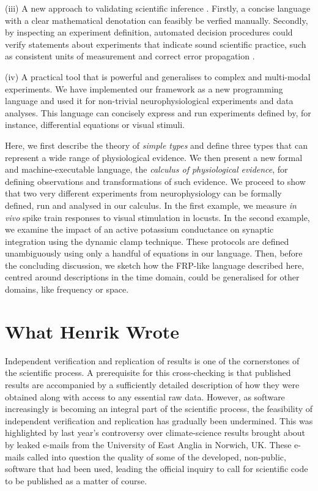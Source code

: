 (iii) A new approach to validating scientific inference
\citep{Editors2003, Editors2010, DeSchutter2010}. Firstly, a concise
language with a clear mathematical denotation can feasibly be verfied
manually. Secondly, by inspecting an experiment definition, automated
decision procedures could verify statements about experiments that
indicate sound scientific practice, such as consistent units of
measurement \citep{Kennedy1997} and correct error propagation
\citep{Taylor1997}.

(iv) A practical tool that is powerful and generalises to complex and
multi-modal experiments. We have implemented our framework as a new
programming language and used it for non-trivial neurophysiological
experiments and data analyses. This language can concisely express and
run experiments defined by, for instance, differential equations or
visual stimuli.

Here, we first describe the theory of \emph{simple types}
\citep{Pierce2002} and define three types that can represent a wide
range of physiological evidence. We then present a new formal and
machine-executable language, the \emph{calculus of physiological
  evidence}, for defining observations and transformations of such
evidence. We proceed to show that two very different experiments from
neurophysiology can be formally defined, run and analysed in our
calculus. In the first example, we measure \emph{in vivo} spike train
responses to visual stimulation in locusts. In the second example, we
examine the impact of an active potassium conductance on synaptic
integration using the dynamic clamp technique. These protocols are
defined unambiguously using only a handful of equations in our
language. Then, before the concluding discussion, we sketch how the
FRP-like language described here, centred around descriptions in the
time domain, could be generalised for other domains, like frequency or
space.


\section*{What Henrik Wrote}

Independent verification and replication of results is one of the cornerstones
of the scientific process. A prerequisite for this cross-checking is that
published results are accompanied by a sufficiently detailed description of
how they were obtained along with access to any essential raw data. However,
as software increasingly is becoming an integral part of the scientific
process, the feasibility of independent verification and replication has
gradually been undermined. This was highlighted by last year's controversy
over climate-science results brought about by leaked e-mails from the
University of East Anglia in Norwich, UK. These e-mails called into question
the quality of some of the developed, non-public, software that had been used,
leading the official inquiry to call for scientific code to be published
as a matter of course.

